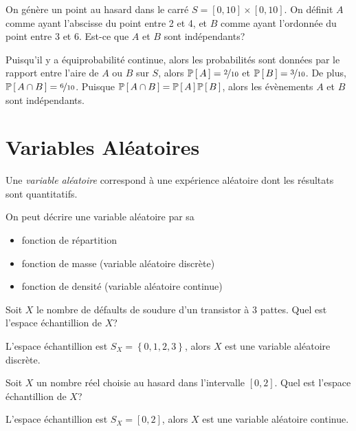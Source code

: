 \documentclass[11pt]{article}
\renewcommand\P[1]{%
	\ensuremath{%
		\mathbb{P}\left[\,#1\,\right]%
	}%
}%
\begin{document}
\begin{exemple}
	On génère un point au hasard dans le carré $S=[0,10]\times[0,10]$. On
	définit $A$ comme ayant l'abscisse du point entre 2 et 4, et $B$ comme
	ayant l'ordonnée du point entre 3 et 6. Est-ce que $A$ et $B$ sont
	indépendants?
	\begin{figure}[H]
		\centering
		
	\end{figure}
\end{exemple}
\addtocounter{exemple}{-1}
\begin{exemple}[suite]
	Puisqu'il y a équiprobabilité continue, alors les probabilités sont données
	par le rapport entre l'aire de $A$ ou $B$ sur $S$, alors
	$\P{A}=\nicefrac{2}{10}$ et $\P{B}=\nicefrac{3}{10}$. De plus,
	$\P{A\cap B}=\nicefrac{6}{10}$. Puisque $\P{A\cap B}=\P{A}\P{B}$, alors les
	évènements $A$ et $B$ sont indépendants.
\end{exemple}

\section{Variables Aléatoires}
\begin{definition}
	Une \textit{variable aléatoire} correspond à une expérience aléatoire dont
	les résultats sont quantitatifs.
\end{definition}

On peut décrire une variable aléatoire par sa
\begin{itemize}
	\item fonction de répartition
	\item fonction de masse (variable aléatoire discrète)
	\item fonction de densité (variable aléatoire continue)
\end{itemize}

\begin{exemple}
	Soit $X$ le nombre de défaults de soudure d'un transistor à 3 pattes. Quel
	est l'espace échantillion de $X$?

	L'espace échantillion est $S_X=\left\{0,1,2,3\right\}$, alors $X$ est une
	variable aléatoire discrète.
\end{exemple}

\begin{exemple}
	Soit $X$ un nombre réel choisie au hasard dans l'intervalle $[0,2]$. Quel
	est l'espace échantillion de $X$?

	L'espace échantillion est $S_X=[0,2]$, alors $X$ est une variable aléatoire
	continue.
\end{exemple}
\end{document}
